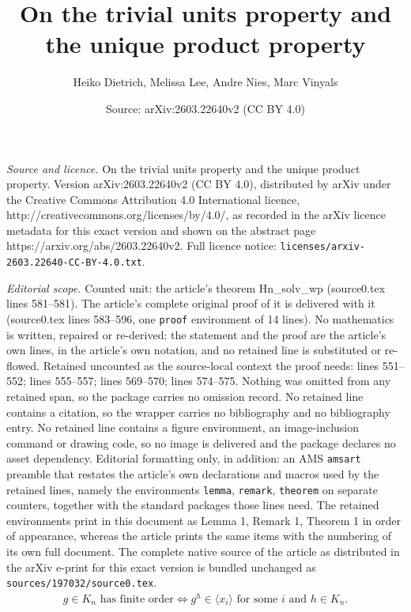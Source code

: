 \documentclass[10pt,a4paper]{amsart}
\title{On the trivial units property and the unique product property}
\author{Heiko Dietrich, Melissa Lee, Andre Nies, Marc Vinyals}
\date{Source: arXiv:2603.22640v2 (CC BY 4.0)}
\begin{document}
\maketitle

\noindent\emph{Source and licence.} On the trivial units property and the unique product property. Version arXiv:2603.22640v2 (CC BY 4.0), distributed by arXiv under the Creative Commons Attribution 4.0 International licence, http://creativecommons.org/licenses/by/4.0/, as recorded in the arXiv licence metadata for this exact version and shown on the abstract page https://arxiv.org/abs/2603.22640v2. Full licence notice: \texttt{licenses/arxiv-2603.22640-CC-BY-4.0.txt}.\par\smallskip

\noindent\textit{Editorial scope.} Counted unit: the article's theorem Hn\_solv\_wp (source0.tex lines 581--581). The article's complete original proof of it is delivered with it (source0.tex lines 583--596, one \texttt{proof} environment of 14 lines). No mathematics is written, repaired or re-derived: the statement and the proof are the article's own lines, in the article's own notation, and no retained line is substituted or re-flowed.  Retained uncounted as the source-local context the proof needs: lines 551--552; lines 555--557; lines 569--570; lines 574--575.  Nothing was omitted from any retained span, so the package carries no omission record.  No retained line contains a citation, so the wrapper carries no bibliography and no bibliography entry.  No retained line contains a figure environment, an image-inclusion command or drawing code, so no image is delivered and the package declares no asset dependency.  Editorial formatting only, in addition: an AMS \texttt{amsart} preamble that restates the article's own declarations and macros used by the retained lines, namely the environments \texttt{lemma}, \texttt{remark}, \texttt{theorem} on separate counters, together with the standard packages those lines need.  The retained environments print in this document as Lemma 1, Remark 1, Theorem 1 in order of appearance, whereas the article prints the same items with the numbering of its own full document.  The complete native source of the article as distributed in the arXiv e-print for this exact version is bundled unchanged as \texttt{sources/197032/source0.tex}.
\begin{align}\label{eq_fo} g\in K_n\text{ has finite order} \iff g^h\in \langle x_i \rangle \text{ for some $i$ and $h\in K_n$}.
\end{align}
\end{document}
